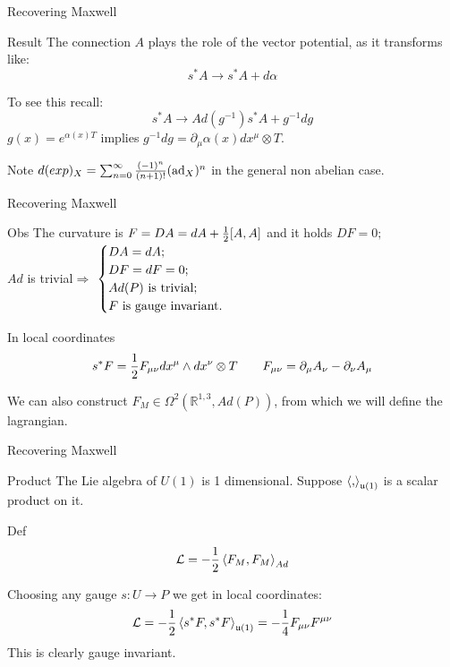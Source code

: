 \documentclass{beamer}
\begin{document}
\begin{frame}{Recovering Maxwell}
	\begin{block}{Result}
		The connection $A$ plays the role of the vector potential, as it transforms like:
		$$s^*A\rightarrow s^*A+d\alpha$$
	\end{block}
	To see this recall:
	$$s^*A\rightarrow Ad(g^{-1})s^*A+g^{-1}dg$$
	$g(x)=e^{\alpha(x) T}$ implies $g^{-1}dg=\partial_\mu \alpha(x)dx^\mu\otimes T$.
	\begin{alertblock}{Note}
		$d(exp)_X=\sum_{n=0}^{\infty}{(-1)^n\over (n+1)!}(\hbox{ad}_X)^n$ in the general non abelian case.
	\end{alertblock}
\end{frame}
\begin{frame}{Recovering Maxwell}
	\begin{exampleblock}{Obs}
		The curvature is $F=DA=dA+{1\over 2}[A,A]$ and it holds $DF=0;$\\
		$Ad$ is trivial$\Longrightarrow$ 
		$\begin{cases}
			DA=dA;\\
			DF=dF=0;\\
			Ad(P)\hbox{ is trivial;}\\  
			F \hbox{ is gauge invariant.}\\
		\end{cases}$
	\end{exampleblock}
	\begin{block}{In local coordinates}
		$$s^*F={1\over 2}F_{\mu\nu}dx^\mu\wedge dx^\nu\otimes T\hspace{20 pt} F_{\mu\nu}=\partial_\mu A_\nu-\partial_\nu A_\mu$$
	\end{block}
	We can also construct $F_M\in\Omega^2(\mathbb{R}^{1,3},Ad(P))$, from which we will define the lagrangian.
\end{frame}
\begin{frame}{Recovering Maxwell}
	\begin{block}{Product}
		The Lie algebra of $U(1)$ is 1 dimensional. Suppose $\braket{,}_{\mathfrak{u}(1)}$ is a scalar product on it.
	\end{block}
	\begin{exampleblock}{Def}
		$$\mathcal{L}=-{1\over 2}\braket{F_M,F_M}_{Ad}$$
	\end{exampleblock}
	Choosing any gauge $s:U\rightarrow P$ we get in local coordinates:
	$$\mathcal{L}=-{1\over 2}\braket{s^*F,s^*F}_{\mathfrak{u}(1)}=-{1\over 4}F_{\mu\nu}F^{\mu\nu}$$
	This is clearly gauge invariant.
\end{frame}
\end{document}

